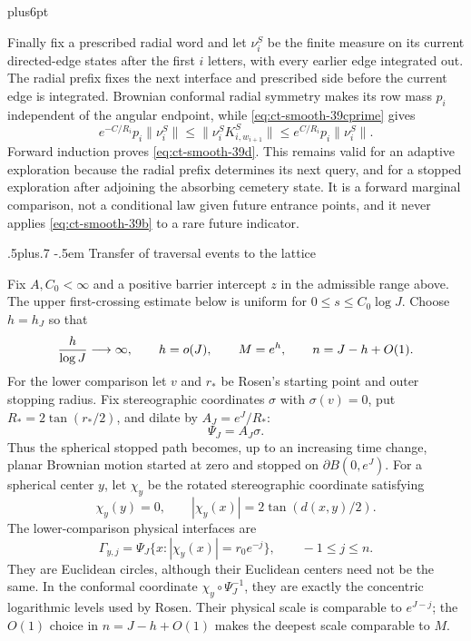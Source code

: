 \documentclass[12pt,reqno]{amsart}
\makeatletter
\def\subsection{\@startsection{subsection}{2}{0pt}%
  {.5\linespacing plus.7\linespacing}
  {-.5em}
  {\normalfont\scshape}}
\theoremstyle{plain}
\theoremstyle{definition}
\theoremstyle{remark}
\renewenvironment{proof}[1][\proofname]{%
  \par
  \pushQED{\qed}%
  \normalfont
  \topsep6pt plus6pt\relax
  \trivlist
  \item[\hskip\labelsep\slshape #1\@addpunct{.}]%
  \ignorespaces
}{%
  \popQED
  \endtrivlist
  \@endpefalse
}
\DeclareRobustCommand{\qed}{%
  \leavevmode\unskip\penalty9999\hbox{}\nobreak
  \ifmmode
    \makebox[0pt][l]{\qquad\hbox{\qedsymbol}}%
  \else
    \qquad\hbox{\qedsymbol}%
  \fi
}
\renewcommand{\qedsymbol}{\rule[.47pt]{4pt}{6pt}}
\numberwithin{equation}{section}
\makeatother
\begin{document}
\begin{proof}[Proof of Lemma~\ref{lem:smooth-interface-discretization}]
Finally fix a prescribed radial word and let $\nu_i^S$ be the finite
measure on its current directed-edge states after the first $i$ letters,
with every earlier edge integrated out.  The radial prefix fixes the next
interface and prescribed side before the current edge is integrated.
Brownian conformal radial symmetry makes its row mass $p_i$ independent
of the angular endpoint, while \eqref{eq:ct-smooth-39cprime} gives
\begin{equation}
e^{-C/R_i}p_i\|\nu_i^S\|
 \le\|\nu_i^SK^S_{i,w_{i+1}}\|
 \le e^{C/R_i}p_i\|\nu_i^S\|.\label{eq:ct-smooth-39iprime}
\end{equation}
Forward induction proves \eqref{eq:ct-smooth-39d}.  This remains valid for an adaptive
exploration because the radial prefix determines its next query, and for a
stopped exploration after adjoining the absorbing cemetery state.  It is a
forward marginal comparison, not a conditional law given future entrance
points, and it never applies \eqref{eq:ct-smooth-39b} to a rare future indicator.
\end{proof}

\subsection{Transfer of traversal events to the lattice}

Fix $A,C_0<\infty$ and a positive barrier intercept $z$ in the
admissible range above.  The upper first-crossing estimate below is uniform
for $0\le s\le C_0\log J$.  Choose $h=h_J$ so that
\begin{equation}
{h\over\log J}\longrightarrow\infty,\qquad h=o(J),\qquad
 M=e^h,\qquad n=J-h+O(1).\label{eq:ct-transfer-39}
\end{equation}
For the lower comparison let $v$ and $r_*$ be Rosen's starting
point and outer stopping radius.  Fix stereographic coordinates $\sigma$ with
$\sigma(v)=0$, put $R_*=2\tan(r_*/2)$, and dilate by
$A_J=e^J/R_*$:
\[
\Psi_J=A_J\sigma .
\]
Thus the spherical stopped path becomes, up to an increasing time
change, planar Brownian motion started at zero and stopped on
$\partial B(0,e^J)$.  For a spherical center $y$, let $\chi_y$ be
the rotated stereographic coordinate satisfying
\[
\chi_y(y)=0,\qquad |\chi_y(x)|=2\tan(d(x,y)/2).
\]
The lower-comparison physical interfaces are
\begin{equation}
\Gamma_{y,j}=\Psi_J\{x:|\chi_y(x)|=r_0e^{-j}\},
       \qquad-1\le j\le n.\label{eq:ct-transfer-39g}
\end{equation}
They are Euclidean circles, although their Euclidean centers need not be
the same.  In the conformal coordinate
$\chi_y\circ\Psi_J^{-1}$, they are exactly the concentric logarithmic
levels used by Rosen.  Their physical scale is comparable to
$e^{J-j}$; the $O(1)$ choice in $n=J-h+O(1)$ makes the deepest
scale comparable to $M$.
\end{document}
